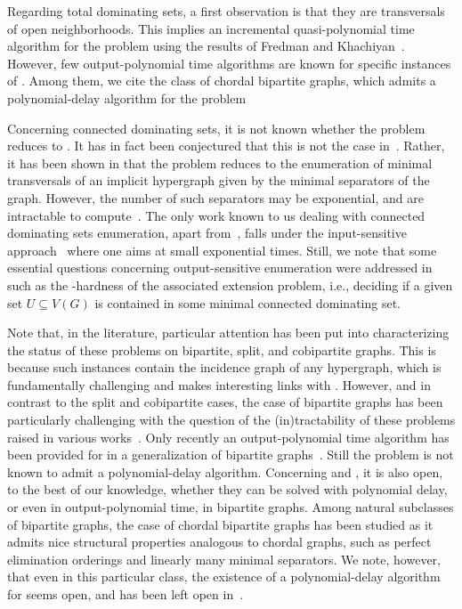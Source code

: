 Regarding total dominating sets, a first observation is that they are transversals of open neighborhoods. This implies an incremental quasi-polynomial time algorithm for the problem using the results of Fredman and Khachiyan~\cite{fredman1996complexity}.
However, few output-polynomial time algorithms are known for specific instances of \tdomenum{}.
Among them, we cite the class of chordal bipartite graphs, which admits a polynomial-delay algorithm for the problem \cite{golovach2016enumerating} 

Concerning connected dominating sets, it is not known whether the problem reduces to \transenum{}. 
It has in fact been conjectured that this is not the case in~\cite{lorentz2015open}.
Rather, it has been shown in \cite{kante2014split} that the problem reduces to the enumeration of minimal transversals of an implicit hypergraph given by the minimal separators of the graph.
However, the number of such separators may be exponential, and are intractable to compute~\cite{brosse2024hardness}.
The only work known to us dealing with connected dominating sets enumeration, apart from~\cite{kante2014split}, falls under the input-sensitive approach~\cite{golovach2016connected,golovach2020connected,abu2022connected} where one aims at small exponential times.
Still, we note that some essential questions concerning output-sensitive enumeration were addressed in~\cite{abu2022connected} such as the \NP-hardness of the associated extension problem, i.e., deciding if a given set $U \subseteq V(G)$ is contained in some minimal connected dominating set.

Note that, in the literature, particular attention has been put into characterizing the status of these problems on bipartite, split, and cobipartite graphs.
This is because such instances contain the incidence graph of any hypergraph, which is fundamentally challenging and makes interesting links with \transenum{}.
However, and in contrast to the split and cobipartite cases, the case of bipartite graphs has been particularly challenging with the question of the (in)tractability of these problems raised in various works~\cite{kante2014encyclopedia,golovach2016enumerating}. 
Only recently an output-polynomial time algorithm has been provided for \domenum{} in a generalization of bipartite graphs~\cite{bonamy2020kt}.
Still the problem is not known to admit a polynomial-delay algorithm.
Concerning \tdomenum{} and \cdomenum{}, it is also open, to the best of our knowledge, whether they can be solved with polynomial delay, or even in output-polynomial time, in bipartite graphs.
Among natural subclasses of bipartite graphs, the case of chordal bipartite graphs has been studied as it admits nice structural properties analogous to chordal graphs, such as perfect elimination orderings and linearly many minimal separators.
We note, however, that even in this particular class, the existence of a polynomial-delay algorithm for \domenum{} seems open, and has been left open in~\cite{golovach2016enumerating}.

